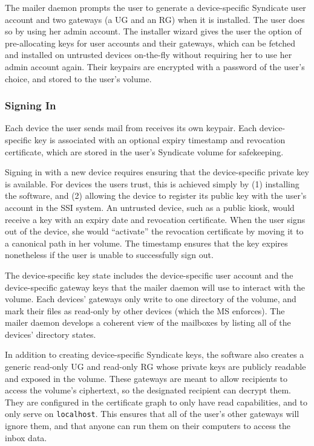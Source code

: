 The mailer daemon prompts the user to generate a device-specific
Syndicate user account and two gateways (a UG and an RG)
when it is installed.  The user does so by using her
admin account.  The installer wizard gives the user the option of pre-allocating
keys for user accounts and their gateways, which can be fetched and installed on untrusted devices
on-the-fly without requiring her to use her admin account again.  Their
keypairs are encrypted with a password of the user's choice, and stored to the user's
volume.

\subsubsection{Signing In}

Each device the user sends mail from receives its own keypair.  Each
device-specific key is associated with an optional expiry timestamp and
revocation certificate, which are stored in the user's Syndicate volume for
safekeeping.

Signing in with a new device requires ensuring that the device-specific private key is
available.  For devices the users trust, this is achieved simply by (1)
installing the software, and (2) allowing the device to register its public key
with the user's account in the SSI system.  An untrusted device, such as a
public kiosk, would receive a key with an expiry date and revocation certificate.
When the user signs out of the device, she would ``activate'' the revocation
certificate by moving it to a canonical path in her volume.  The timestamp
ensures that the key expires nonetheless if the user is unable to successfully
sign out.

The device-specific key state includes the device-specific user account and the
device-specific gateway keys that the mailer daemon will use to interact with
the volume.  Each devices' gateways only write to one directory of the volume,
and mark their files as read-only by other devices (which the MS enforces).
The mailer daemon develops a coherent view of the mailboxes by listing all of
the devices' directory states.

In addition to creating device-specific Syndicate keys, the software also
creates a generic read-only UG and read-only RG whose private keys are publicly readable
and exposed in the volume.  These gateways are meant to allow recipients to access
the volume's ciphertext, so the designated recipient can decrypt them.
They are configured in the certificate graph to only have read capabilities, and
to only serve on \texttt{localhost}.  This ensures that all of the user's other
gateways will ignore them, and that anyone can run them on their computers to
access the inbox data.

